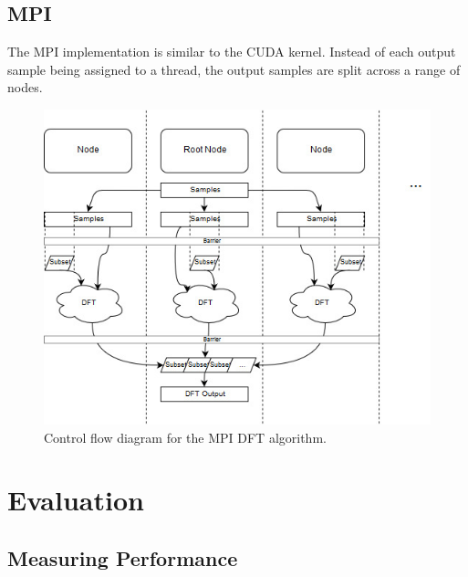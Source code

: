 \documentclass[11pt,a4paper]{article}
\begin{document}
\subsection{MPI}
The MPI implementation is similar to the CUDA kernel. Instead of each output sample being assigned to a thread, the output samples are split across a range of nodes. 

\begin{figure}[H]
\begin{center}
\includegraphics[scale=0.7]{mpi_impl1}
\end{center}
\caption{Control flow diagram for the MPI DFT algorithm.}
\label{fig:train10x}
\end{figure}

\section{Evaluation}
\subsection{Measuring Performance}
\end{document}
